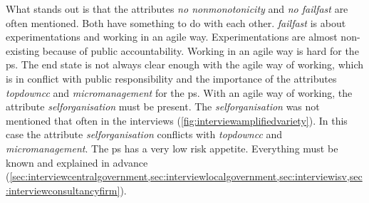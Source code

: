 What stands out is that the \glspl{attribute} \textit{no \gls{nonmonotonicity}} and \textit{no \gls{failfast}} are often mentioned. Both have something to do with each other. \textit{\Gls{failfast}} is about experimentations and working in an \gls{agile} way. Experimentations are almost non-existing because of public accountability. Working in an \gls{agile} way is hard for the \gls{ps}. The end state is not always clear enough with the \gls{agile} way of working, which is in conflict with public responsibility and the importance of the attributes \textit{\gls{topdowncc}} and \textit{\gls{micromanagement}} for the \gls{ps}. With an \gls{agile} way of working, the attribute \textit{\gls{selforganisation}} must be present. The \textit{\gls{selforganisation}} was not mentioned that often in the interviews (\cref{fig:interviewamplifiedvariety}). In this case the \gls{attribute} \textit{\gls{selforganisation}} conflicts with \textit{\gls{topdowncc}} and \textit{\gls{micromanagement}}. The \gls{ps} has a very low risk appetite. Everything must be known and explained in advance (\cref{sec:interviewcentralgovernment,sec:interviewlocalgovernment,sec:interviewisv,sec:interviewconsultancyfirm}). 
